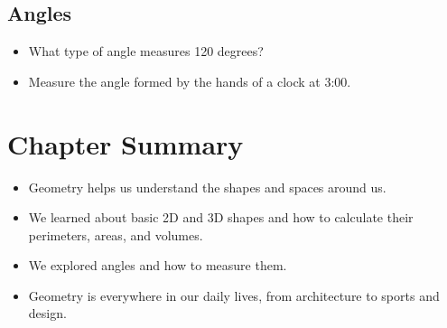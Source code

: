 \subsection{Angles}
\begin{itemize}
    \item What type of angle measures 120 degrees?
    \item Measure the angle formed by the hands of a clock at 3:00.
\end{itemize}

\section{Chapter Summary}
\begin{itemize}
    \item Geometry helps us understand the shapes and spaces around us.
    \item We learned about basic 2D and 3D shapes and how to calculate their perimeters, areas, and volumes.
    \item We explored angles and how to measure them.
    \item Geometry is everywhere in our daily lives, from architecture to sports and design.
\end{itemize}

